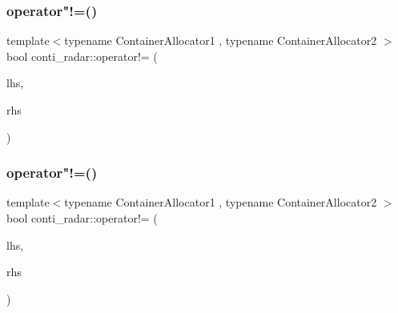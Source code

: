 \subsubsection{\texorpdfstring{operator"!=()}{operator!=()}\hspace{0.1cm}{\footnotesize\ttfamily [1/2]}}
{\footnotesize\ttfamily template$<$typename Container\+Allocator1 , typename Container\+Allocator2 $>$ \\
bool conti\+\_\+radar\+::operator!= (\begin{DoxyParamCaption}\item[{const \+::\hyperlink{structconti__radar_1_1Measurement__}{conti\+\_\+radar\+::\+Measurement\+\_\+}$<$ Container\+Allocator1 $>$ \&}]{lhs,  }\item[{const \+::\hyperlink{structconti__radar_1_1Measurement__}{conti\+\_\+radar\+::\+Measurement\+\_\+}$<$ Container\+Allocator2 $>$ \&}]{rhs }\end{DoxyParamCaption})}

\mbox{\label{namespaceconti__radar_a655b3a6c63e06866d91dc3f1947631e2}} 
\subsubsection{\texorpdfstring{operator"!=()}{operator!=()}\hspace{0.1cm}{\footnotesize\ttfamily [2/2]}}
{\footnotesize\ttfamily template$<$typename Container\+Allocator1 , typename Container\+Allocator2 $>$ \\
bool conti\+\_\+radar\+::operator!= (\begin{DoxyParamCaption}\item[{const \+::\hyperlink{structconti__radar_1_1ContiRadar__}{conti\+\_\+radar\+::\+Conti\+Radar\+\_\+}$<$ Container\+Allocator1 $>$ \&}]{lhs,  }\item[{const \+::\hyperlink{structconti__radar_1_1ContiRadar__}{conti\+\_\+radar\+::\+Conti\+Radar\+\_\+}$<$ Container\+Allocator2 $>$ \&}]{rhs }\end{DoxyParamCaption})}

\mbox{\label{namespaceconti__radar_a0d0d9b62186db990827f43426ec8aa39}} 

